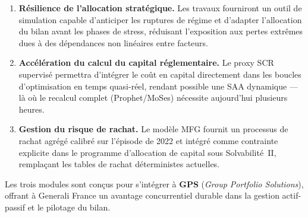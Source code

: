\documentclass[10pt,a4paper]{article}
\begin{document}
\begin{enumerate}[leftmargin=2em,itemsep=4pt]
  \item \textbf{Résilience de l'allocation stratégique.}
        Les travaux fourniront un outil de simulation capable d'anticiper les
        ruptures de régime et d'adapter l'allocation du bilan avant les phases
        de stress, réduisant l'exposition aux pertes extrêmes dues à des
        dépendances non linéaires entre facteurs.

  \item \textbf{Accélération du calcul du capital réglementaire.}
        Le proxy SCR supervisé permettra d'intégrer le coût en capital
        directement dans les boucles d'optimisation en temps quasi-réel,
        rendant possible une SAA dynamique --- là où le recalcul complet
        (Prophet/MoSes) nécessite aujourd'hui plusieurs heures.

  \item \textbf{Gestion du risque de rachat.}
        Le modèle MFG fournit un processus de rachat agrégé calibré sur
        l'épisode de 2022 et intégré comme contrainte explicite dans le
        programme d'allocation de capital sous Solvabilité~II, remplaçant
        les tables de rachat déterministes actuelles.
\end{enumerate}

\medskip
\noindent Les trois modules sont conçus pour s'intégrer à \textbf{GPS}
(\textit{Group Portfolio Solutions}), offrant à Generali France un avantage
concurrentiel durable dans la gestion actif-passif et le pilotage du bilan.
\end{document}
